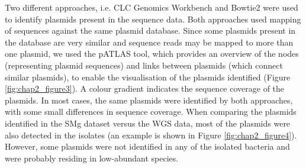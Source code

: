 Two different approaches, i.e. CLC Genomics Workbench and Bowtie2 were used to identify plasmids present in the sequence data. 
Both approaches used mapping of sequences against the same plasmid database. 
Since some plasmids present in the database are very similar and sequence reads may be mapped to more than one plasmid, we used the pATLAS tool, which provides an overview of the nodes (representing plasmid sequences) and links between plasmids (which connect similar plasmids), to enable the visualisation of the plasmids identified (Figure \ref{fig:chap2_figure3}). 
A colour gradient indicates the sequence coverage of the plasmids. 
In most cases, the same plasmids were identified by both approaches, with some small differences in sequence coverage. 
When comparing the plasmids identified in the \ac{SMg} dataset versus the \ac{WGS} data, most of the plasmids were also detected in the isolates (an example is shown in Figure \ref{fig:chap2_figure4}). 
However, some plasmids were not identified in any of the isolated bacteria and were probably residing in low-abundant species.

